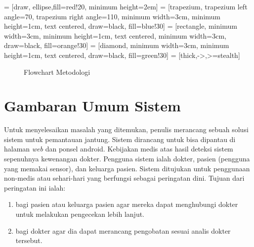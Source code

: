 
\usetikzlibrary{positioning}
 = [draw, ellipse,fill=red!20, minimum height=2em]
 = [trapezium, trapezium left angle=70, trapezium right angle=110, minimum width=3cm, minimum height=1cm, text centered, draw=black, fill=blue!30]
 = [rectangle, minimum width=3cm, minimum height=1cm, text centered, minimum width=3cm, draw=black, fill=orange!30]
 = [diamond, minimum width=3cm, minimum height=1cm, text centered, draw=black, fill=green!30]
 = [thick,->,>=stealth]

\begin{figure}[H]
    \centering
    \caption{Flowchart Metodologi}
	\label{fig_flow_method}
\end{figure}

\section{Gambaran Umum Sistem}
Untuk menyelesaikan masalah yang ditemukan, penulis merancang sebuah solusi sistem untuk pemantauan jantung. Sistem dirancang untuk bisa dipantau di halaman \textit{web} dan ponsel android. Kebijakan medis atas hasil deteksi sistem sepenuhnya kewenangan dokter. Pengguna sistem ialah dokter, pasien (pengguna yang memakai sensor), dan keluarga pasien. Sistem ditujukan untuk penggunaan non-medis atau sehari-hari yang berfungsi sebagai peringatan dini. Tujuan dari peringatan ini ialah:
\begin{enumerate}
	\item bagi pasien atau keluarga pasien agar mereka dapat menghubungi dokter untuk melakukan pengecekan lebih lanjut.
	\item bagi dokter agar dia dapat merancang pengobatan sesuai analis dokter tersebut.
\end{enumerate}

